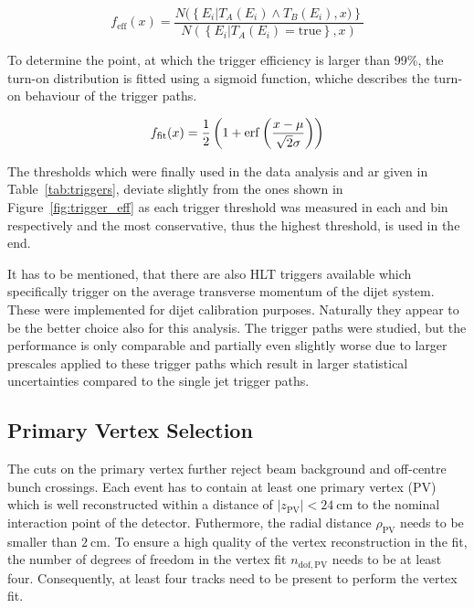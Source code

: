 \begin{equation}
\label{eq:trigger_eff}
    f_{\mathrm{eff}} (x) = \frac{N(\left\{E_i|T_A(E_i) \wedge T_B(E_i), x)\right\}}{N(\left\{ E_i | T_A(E_i) = \mathrm{true} \right\} , x)}
\end{equation}

To determine the point, at which the trigger efficiency is larger than 99\%, the
turn-on distribution is fitted using a sigmoid function, whiche describes the
turn-on behaviour of the trigger paths.

\begin{equation}
\label{eq:trigger_eff_fit}
    f_{\mathrm{fit}} (x) = \frac{1}{2} \left( 1 + \operatorname{erf} \left(\frac{x-\mu}{\sqrt{2}\sigma}\right)\right)
\end{equation}

The thresholds which were finally used in the data analysis and ar given in
Table~\ref{tab:triggers}, deviate slightly from the ones shown in
Figure~\ref{fig:trigger_eff} as each trigger threshold was measured in each
\ystar and \yboost bin respectively and the most conservative, thus the highest
threshold, is used in the end.

It has to be mentioned, that there are also HLT triggers available which
specifically trigger on the average transverse momentum of the dijet system.
These were implemented for dijet calibration purposes. Naturally they appear to
be the better choice also for this analysis. The \ptavg trigger paths were studied,
but the performance is only comparable and partially even slightly worse due to
larger prescales applied to these trigger paths which result in larger
statistical uncertainties compared to the single jet trigger paths.

\subsection{Primary Vertex Selection}

The cuts on the primary vertex further reject beam background and off-centre bunch
crossings. Each event has to contain at least one primary vertex (PV) which is well
reconstructed within a distance of $|z_\mathrm{PV}| < \SI{24}{\centi \meter}$ to
the nominal interaction point of the detector. Futhermore, the radial distance
$\rho_\mathrm{PV}$ needs to be smaller than $\SI{2}{\centi\meter}$. To
ensure a high quality of the vertex reconstruction in the fit, the number of
degrees of freedom in the vertex fit $n_{\mathrm{dof,PV}}$ needs to be at least
four. Consequently, at least four tracks need to be present to
perform the vertex fit.

